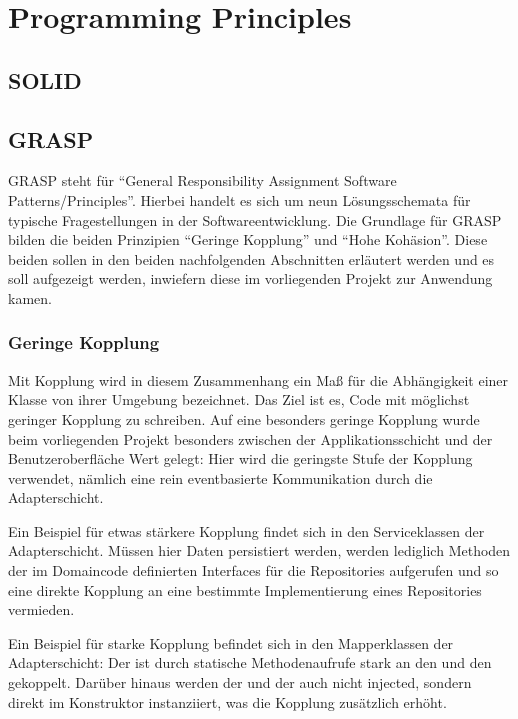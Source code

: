 \chapter{Programming Principles}

\section{SOLID}

\section{GRASP}
GRASP steht für \enquote{General Responsibility Assignment Software Patterns/Principles}. Hierbei handelt es sich um neun Lösungsschemata für typische Fragestellungen in der Softwareentwicklung. Die Grundlage für GRASP bilden die beiden Prinzipien \enquote{Geringe Kopplung} und \enquote{Hohe Kohäsion}. Diese beiden sollen in den beiden nachfolgenden Abschnitten erläutert werden und es soll aufgezeigt werden, inwiefern diese im vorliegenden Projekt zur Anwendung kamen.

\subsection{Geringe Kopplung}
Mit Kopplung wird in diesem Zusammenhang ein Maß für die Abhängigkeit einer Klasse von ihrer Umgebung bezeichnet. Das Ziel ist es, Code mit möglichst geringer Kopplung zu schreiben. Auf eine besonders geringe Kopplung wurde beim vorliegenden Projekt besonders zwischen der Applikationsschicht und der Benutzeroberfläche Wert gelegt: Hier wird die geringste Stufe der Kopplung verwendet, nämlich eine rein eventbasierte Kommunikation durch die Adapterschicht.

Ein Beispiel für etwas stärkere Kopplung findet sich in den Serviceklassen der Adapterschicht. Müssen hier Daten persistiert werden, werden lediglich Methoden der im Domaincode definierten Interfaces für die Repositories aufgerufen und so eine direkte Kopplung an eine bestimmte Implementierung eines Repositories vermieden.

Ein Beispiel für starke Kopplung befindet sich in den Mapperklassen der Adapterschicht: Der  ist durch statische Methodenaufrufe stark an den  und den  gekoppelt. Darüber hinaus werden der  und der  auch nicht injected, sondern direkt im Konstruktor instanziiert, was die Kopplung zusätzlich erhöht.

